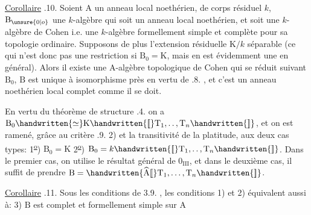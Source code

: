 

\uline{Corollaire} .10. Soient $\mathrm A$ un anneau local noethérien, de corps résiduel $k$, $\mathrm B_{\unsure{0|o}}$ une $k$-algèbre qui soit un anneau local noethérien, et soit une $k$-algèbre de Cohen i.e. une $k$-algèbre formellement simple  et complète pour sa topologie ordinaire. Supposons de plus l'extension résiduelle $\mathrm K/k$ séparable (ce qui n'est donc pas une restriction si $\mathrm B_0=\mathrm K$, mais en est évidemment une en général). Alors il existe une $\mathrm A$-algèbre topologique de Cohen  qui se réduit suivant $\mathrm B_0$, $\mathrm B$ est unique à isomorphisme près en vertu de .8. , et c'est un anneau noethérien local complet comme il se doit.

En vertu du théorème de structure .4. on a $\mathrm B_0\handwritten{\simeq}\mathrm K\handwritten{[\![}\mathrm T_1,\ldotp\ldotp,\mathrm T_n\handwritten{]\!]}$, et on est ramené, grâce au critère .9. 2) et la transitivité de la platitude, aux deux cas types: 1\textsuperscript{\uline{o}}) $\mathrm B_0=\mathrm K$ 2\textsuperscript{\uline{o}}) $\mathrm B_0=k\handwritten{[\![}\mathrm T_1,\ldotp\ldotp,\mathrm T_n\handwritten{]\!]}$. Dans le premier cas, on utilise le résultat général de $0_{\mathrm{III}}$, et dans le deuxième cas, il suffit de prendre $\mathrm B=\handwritten{\widehat{\mathrm A}[\![}\mathrm T_1,\ldots,\mathrm T_n\handwritten{]\!]}$.

 \uline{Corollaire} .11. Sous les conditions de 3.9. ,  les conditions 1) et 2) équivalent aussi à: 3) $\mathrm B$ est complet et formellement simple sur $\mathrm A$

